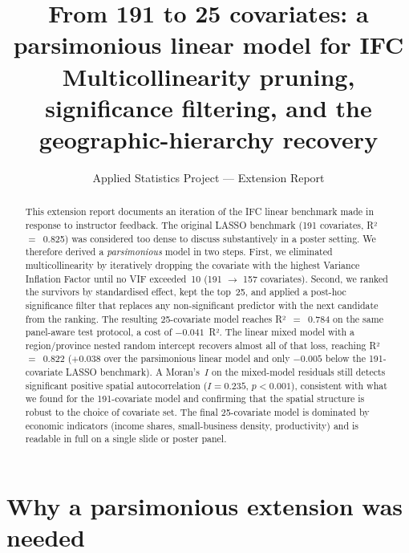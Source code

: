 \documentclass[11pt,a4paper]{article}
\title{From 191 to 25 covariates: a parsimonious linear model for IFC\\[0.3em]
  \large Multicollinearity pruning, significance filtering, and the
  geographic-hierarchy recovery}
\author{Applied Statistics Project --- Extension Report}
\date{}
\begin{document}
\maketitle

\begin{abstract}
\noindent
This extension report documents an iteration of the IFC linear
benchmark made in response to instructor feedback. The original LASSO
benchmark (191 covariates, R²~$=$~0.825) was considered too dense to
discuss substantively in a poster setting. We therefore derived a
\emph{parsimonious} model in two steps. First, we eliminated
multicollinearity by iteratively dropping the covariate with the
highest Variance Inflation Factor until no VIF exceeded~10 (191 $\to$
157 covariates). Second, we ranked the survivors by standardised
effect, kept the top~25, and applied a post-hoc significance filter
that replaces any non-significant predictor with the next candidate
from the ranking. The resulting 25-covariate model reaches R²~$=$~0.784
on the same panel-aware test protocol, a cost of $-0.041$~R². The
linear mixed model with a region/province nested random intercept
recovers almost all of that loss, reaching R²~$=$~0.822 ($+0.038$ over
the parsimonious linear model and only $-0.005$ below the
191-covariate LASSO benchmark). A Moran's~$I$ on the mixed-model
residuals still detects significant positive spatial autocorrelation
($I = 0.235$, $p < 0.001$), consistent with what we found for the
191-covariate model and confirming that the spatial structure is
robust to the choice of covariate set. The final 25-covariate model
is dominated by economic indicators (income shares, small-business
density, productivity) and is readable in full on a single slide or
poster panel.
\end{abstract}

\section{Why a parsimonious extension was needed}
\end{document}
